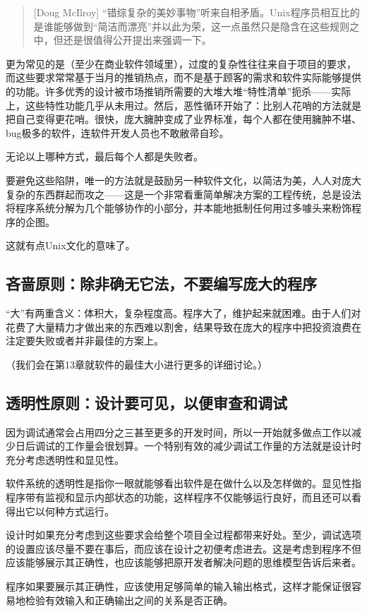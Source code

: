 \documentclass[12pt,oneside]{book}
\begin{document}
\begin{quote}[Doug McIlroy]
“错综复杂的美妙事物”听来自相矛盾。Unix程序员相互比的是谁能够做到“简洁而漂亮”并以此为荣，这一点虽然只是隐含在这些规则之中，但还是很值得公开提出来强调一下。
\end{quote}    

更为常见的是（至少在商业软件领域里），过度的复杂性往往来自于项目的要求，而这些要求常常基于当月的推销热点，而不是基于顾客的需求和软件实际能够提供的功能。许多优秀的设计被市场推销所需要的大堆大堆“特性清单”扼杀——实际上，这些特性功能几乎从未用过。然后，恶性循环开始了：比别人花哨的方法就是把自己变得更花哨。很快，庞大臃肿变成了业界标准，每个人都在使用臃肿不堪、bug极多的软件，连软件开发人员也不敢敝帚自珍。

无论以上哪种方式，最后每个人都是失败者。

要避免这些陷阱，唯一的方法就是鼓励另一种软件文化，以简洁为美，人人对庞大复杂的东西群起而攻之——这是一个非常看重简单解决方案的工程传统，总是设法将程序系统分解为几个能够协作的小部分，并本能地抵制任何用过多噱头来粉饰程序的企图。

这就有点Unix文化的意味了。

\subsection{吝啬原则：除非确无它法，不要编写庞大的程序}
“大”有两重含义：体积大，复杂程度高。程序大了，维护起来就困难。由于人们对花费了大量精力才做出来的东西难以割舍，结果导致在庞大的程序中把投资浪费在注定要失败或者并非最佳的方案上。

（我们会在第13章就软件的最佳大小进行更多的详细讨论。）

\subsection{透明性原则：设计要可见，以便审查和调试}
因为调试通常会占用四分之三甚至更多的开发时间，所以一开始就多做点工作以减少日后调试的工作量会很划算。一个特别有效的减少调试工作量的方法就是设计时充分考虑透明性和显见性。

软件系统的透明性是指你一眼就能够看出软件是在做什么以及怎样做的。显见性指程序带有监视和显示内部状态的功能，这样程序不仅能够运行良好，而且还可以看得出它以何种方式运行。

设计时如果充分考虑到这些要求会给整个项目全过程都带来好处。至少，调试选项的设置应该尽量不要在事后，而应该在设计之初便考虑进去。这是考虑到程序不但应该能够展示其正确性，也应该能够把原开发者解决问题的思维模型告诉后来者。

程序如果要展示其正确性，应该使用足够简单的输入输出格式，这样才能保证很容易地检验有效输入和正确输出之间的关系是否正确。
\end{document}
